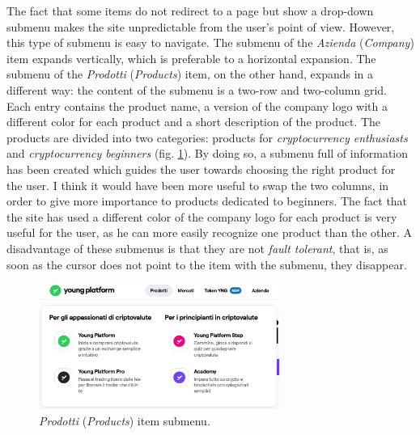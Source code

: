 The fact that some items do not redirect to a page but show a drop-down 
submenu makes the site unpredictable from the user's point of view. 
However, this type of submenu is easy to navigate. The submenu of the 
\textit{Azienda} (\textit{Company}) item expands vertically, which is 
preferable to a horizontal expansion. The submenu of the \textit{Prodotti} 
(\textit{Products}) item, on the other hand, expands in a different way: 
the content of the submenu is a two-row and two-column grid. Each entry 
contains the product name, a version of the company logo with a different 
color for each product and a short description of the product. The 
products are divided into two categories: products for 
\textit{cryptocurrency enthusiasts} and \textit{cryptocurrency beginners} 
(fig. \ref{fig:products-submenu}). By doing so, a submenu full of 
information has been created which guides the user towards choosing the 
right product for the user. I think it would have been more useful to swap 
the two columns, in order to give more importance to products dedicated to 
beginners. The fact that the site has used a different color of the 
company logo for each product is very useful for the user, as he can more 
easily recognize one product than the other. A disadvantage of these 
submenus is that they are not \textit{fault tolerant}, that is, as soon as 
the cursor does not point to the item with the submenu, they disappear.
\begin{figure}[H]
  \centering
  \includegraphics[width=0.70\textwidth]{res/images/products-submenu.png}
  \caption{\textit{Prodotti} (\textit{Products}) item submenu.}
  \label{fig:products-submenu}
\end{figure}